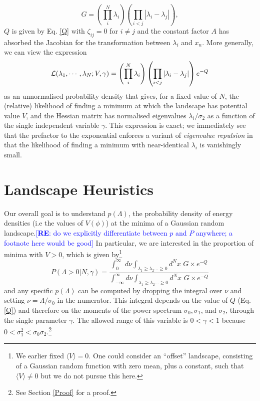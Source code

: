 \documentclass[12pt]{article}
\newcommand{\re}[1]{\textcolor{blue}{[{\bf RE}: #1]}}
\begin{document}
\begin{equation}
G = \left(\prod_{i}^{N} \lambda_i \right)\left(\prod_{i<j} |\lambda_i-\lambda_j|\right),
\end{equation} 
%
$Q$ is given by Eq. \ref{Q} with $\zeta_{ij}=0$ for $i\neq j$ and the constant factor $A$ has absorbed the Jacobian for the transformation between $\lambda_i$ and $x_n$. More generally, we can view the expression
%
\begin{equation}
{\cal L}(\lambda_1,\cdots, \lambda_N; V, \gamma) = \left(\prod_{i}^{N} \lambda_i \right)\left(\prod_{i<j} |\lambda_i-\lambda_j|\right) e^{-Q}
\end{equation} 
%
as an unnormalised probability density that gives, for a fixed value of $N$, the (relative) likelihood of finding a minimum at which the landscape has potential value $V$, and the Hessian matrix has normalised eigenvalues $\lambda_i/\sigma_2$ as a function of the single independent variable $\gamma$. This expression is exact;  we immediately see that the prefactor to the exponential enforces a variant of {\em eigenvalue repulsion\/} \cite{Mehta1990}  in that the likelihood of finding a minimum with near-identical $\lambda_i$ is vanishingly small. 



\section{Landscape Heuristics}

Our  overall goal is to understand $p(\Lambda)$, the probability density of energy densities (i.e the values of $V(\phi)$) at the minima of a Gaussian random landscape.\re{do we explicitly differentiate between $p$ and $P$ anywhere; a footnote here would be good} In particular, we are interested in the proportion of  minima with $V > 0$, which is given by\footnote{We  earlier fixed $\langle V \rangle = 0$. One could consider an ``offset'' landscape, consisting of a Gaussian random function with zero mean, plus a constant, such that $\langle V \rangle \neq 0$ but we do not pursue this here.}
\begin{equation} \label{PminIntegral}
  P(\Lambda >0| N,\gamma) =  \frac{\int^\infty_0 \,\,d\nu \int_{\lambda_1 \geq \lambda_2 \ldots \geq 0} d^Nx \,\, G \times e^{-Q} }{\int^\infty_{-\infty} d\nu \int_{\lambda_1 \geq \lambda_2 \ldots \geq 0} d^Nx\,\,G \times e^{-Q}}
  \end{equation}
 and any specific $p(\Lambda)$ can be computed by dropping the integral over $\nu$ and setting $\nu=\Lambda/\sigma_0$ in the numerator.  
%
This integral depends on the value of $Q$ (Eq. \ref{Q}) and therefore on the moments of the power spectrum $\sigma_0, \sigma_1$,  and $\sigma_2$, through the single parameter $\gamma$. The allowed range of this variable is $0<\gamma<1$ because $0<\sigma_1^2<\sigma_0\sigma_2$.\footnote{See Section \ref{Proof} for a proof.}
\end{document}
